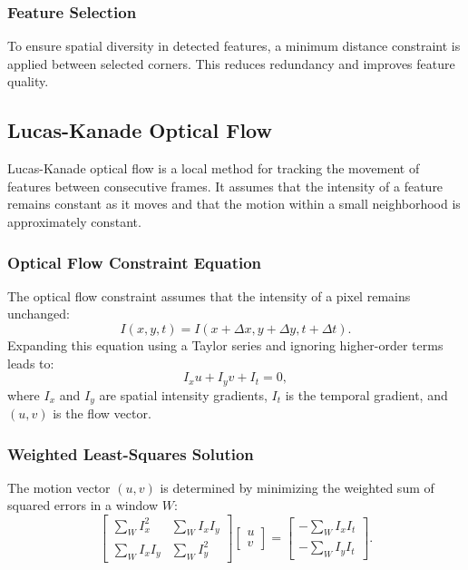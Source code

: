 \documentclass[11pt, conference, letterpaper]{IEEEtran}
\begin{document}
\subsubsection{Feature Selection}
To ensure spatial diversity in detected features, a minimum distance constraint is applied between selected corners. This reduces redundancy and improves feature quality.
\bigskip


\subsection{Lucas-Kanade Optical Flow}
Lucas-Kanade optical flow is a local method for tracking the movement of features between consecutive frames. It assumes that the intensity of a feature remains constant as it moves and that the motion within a small neighborhood is approximately constant.

\subsubsection{Optical Flow Constraint Equation}
The optical flow constraint assumes that the intensity of a pixel remains unchanged:
\begin{equation}
I(x, y, t) = I(x + \Delta x, y + \Delta y, t + \Delta t).
\end{equation}
Expanding this equation using a Taylor series and ignoring higher-order terms leads to:
\begin{equation}
I_x u + I_y v + I_t = 0,
\end{equation}
where \(I_x\) and \(I_y\) are spatial intensity gradients, \(I_t\) is the temporal gradient, and \((u, v)\) is the flow vector.
\bigskip

\subsubsection{Weighted Least-Squares Solution}
The motion vector \((u, v)\) is determined by minimizing the weighted sum of squared errors in a window \(W\):
\begin{equation}
\begin{bmatrix}
\sum_W I_x^2 & \sum_W I_x I_y \\
\sum_W I_x I_y & \sum_W I_y^2
\end{bmatrix}
\begin{bmatrix}
u \\
v
\end{bmatrix}
=
\begin{bmatrix}
-\sum_W I_x I_t \\
-\sum_W I_y I_t
\end{bmatrix}.
\end{equation}
\bigskip
\end{document}
